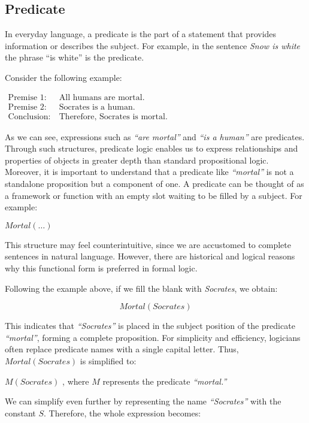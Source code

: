 \documentclass[12pt,a4paper,openany]{article}
\begin{document}
\subsection{Predicate}\label{predicate}

In everyday language, a predicate is the part of a statement that
provides information or describes the subject. For example, in the
sentence \emph{Snow is white} the phrase ``is white'' is the predicate.

Consider the following example:

$
\begin{aligned}
\text{Premise 1:} \ & \text{All humans are mortal.} \\
\text{Premise 2:} \ & \text{Socrates is a human.} \\
\text{Conclusion:} \ & \text{Therefore, Socrates is mortal.}
\end{aligned}
$

As we can see, expressions such as \emph{``are mortal''} and \emph{``is
a human''} are predicates. Through such structures, predicate logic
enables us to express relationships and properties of objects in greater
depth than standard propositional logic. Moreover, it is important to
understand that a predicate like \emph{``mortal''} is not a standalone
proposition but a component of one. A predicate can be thought of as a
framework or function with an empty slot waiting to be filled by a
subject. For example:

\(Mortal(\dots)\)

This structure may feel counterintuitive, since we are accustomed to
complete sentences in natural language. However, there are historical
and logical reasons why this functional form is preferred in formal
logic.

Following the example above, if we fill the blank with \emph{Socrates},
we obtain:

\[Mortal(Socrates)\]

This indicates that \emph{``Socrates''} is placed in the subject
position of the predicate \emph{``mortal''}, forming a complete
proposition. For simplicity and efficiency, logicians often replace
predicate names with a single capital letter. Thus, \(Mortal(Socrates)\)
is simplified to:

\(M(Socrates)\) , where \(M\) represents the predicate
\emph{``mortal.''}

We can simplify even further by representing the name
\emph{``Socrates''} with the constant \(S\). Therefore, the whole
expression becomes:
\end{document}
